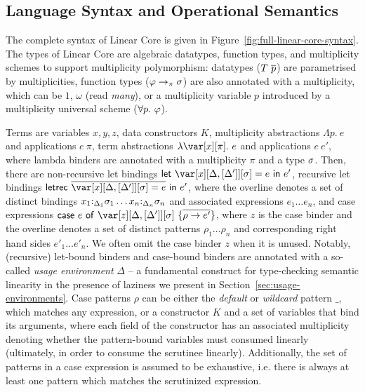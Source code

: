 \documentclass[acmsmall,review,anonymous,screen]{acmart}
\newcommand{\llet}[2]{\mathsf{let}~#1~\mathsf{in}~#2}
\newcommand{\lletrec}[2]{\mathsf{letrec}~#1~\mathsf{in}~#2}
\newcommand{\ccase}[2]{\mathsf{case}~#1~\mathsf{of}~#2}
\begin{document}
%


\subsection{Language Syntax and Operational Semantics}

The complete syntax of Linear Core is given in Figure~\ref{fig:full-linear-core-syntax}.
%
The types of Linear Core are algebraic datatypes, function types, and
multiplicity schemes to support multiplicity polymorphism: datatypes
($T~\overline{p}$) are parametrised by multiplicities, function types
($\varphi\to_\pi\sigma$) are also annotated with a multiplicity, which can be $1$,
$\omega$ (read \emph{many}), or a multiplicity variable $p$ introduced by a
multiplicity universal scheme ($\forall p.~\varphi$).
%

%
Terms are variables $x,y,z$, data constructors $K$, multiplicity
abstractions $\Lambda p.~e$ and applications $e~\pi$, term abstractions
$\lambda \x[\pi].~e$ and applications $e~e'$, where lambda binders are
annotated with a multiplicity $\pi$ and a type $\sigma$. Then, there are
non-recursive let bindings $\llet{\xD = e}{e'}$, recursive let bindings
$\lletrec{\ov{\xD = e}}{e'}$, where the overline denotes a set of distinct
bindings $x_1{:}_{\Delta_1}\sigma_1\dots x_n{:}_{\Delta_n}\sigma_n$ and associated expressions
$e_1\dots e_n$, and case expressions $\ccase{e}{\zD~\{\ov{\rho \to e'}\}}$,
where $z$ is the case binder and the overline denotes a set of distinct
patterns $\rho_1\dots \rho_n$ and corresponding right hand sides $e'_1\dots
e'_n$. We often omit the case binder $z$ when it is unused. Notably, (recursive) let-bound
binders and case-bound binders are annotated
with a so-called \emph{usage environment} $\Delta$ -- a fundamental construct
for type-checking semantic linearity in the presence of laziness we present in
Section~\ref{sec:usage-environments}.
%
Case patterns $\rho$ can be either the \emph{default} or \emph{wildcard}
pattern $\_$, which matches any expression, or a constructor $K$ and a set of
variables that bind its arguments, where each field of the constructor has an
associated multiplicity denoting whether the pattern-bound variables must
consumed linearly (ultimately, in order to consume the scrutinee linearly).
Additionally, the set of patterns in a case expression is assumed to be exhaustive,
i.e. there is always at least one pattern which matches the scrutinized expression.
\end{document}
